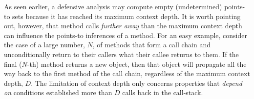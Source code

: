 \begin{itemize}


\end{itemize}


As seen earlier, a defensive analysis may compute empty (undetermined) %
points-to sets because it has reached its maximum context depth.
It is worth pointing out, however, that method calls \emph{further
  away} than the maximum context depth can influence the points-to
inferences of a method. For an easy example, consider the case of a
large number, $N$, of methods that form a call chain and
unconditionally return to their callers what their callee returns to
them. If the final ($N$-th) method returns a new object, then that
object will propagate all the way back to the first method of the call
chain, regardless of the maximum context depth, $D$. The limitation of
context depth only concerns properties that \emph{depend on} conditions
established more than $D$ calls back in the call-stack.


